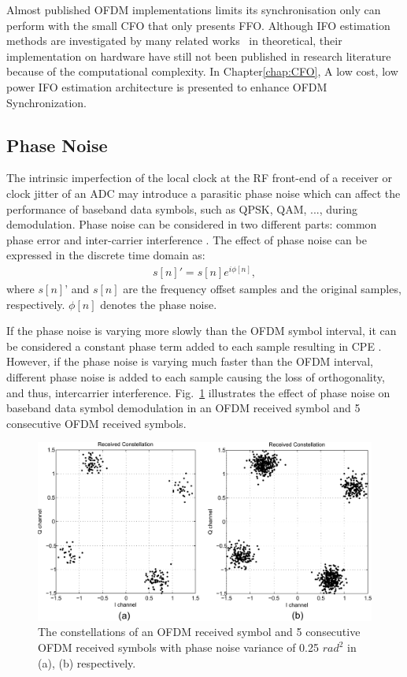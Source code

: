 Almost published OFDM implementations limits its synchronisation only can perform with the small CFO that only presents FFO.
Although IFO estimation methods are investigated by many related works~\cite{Shim2006,Morelli2008,You2010,Lee2013,Morelli2014} in theoretical, their implementation on hardware have still not been published in research literature because of the computational complexity. In Chapter\ref{chap:CFO}, A low cost, low power IFO estimation architecture is presented to enhance OFDM Synchronization. 

\subsection{Phase Noise}

The intrinsic imperfection of the local clock at the RF front-end of a receiver or clock jitter of an ADC may introduce a parasitic phase noise which can affect the performance of baseband data symbols, such as QPSK, QAM, ..., during demodulation.
Phase noise can be considered in two different parts: common phase error and inter-carrier interference \cite{Armada1998}. The effect of phase noise can be expressed in the discrete time domain as:
\begin{eqnarray}
\label{equ:}
            s[n]' = s[n] e^{i\phi[n]},
\end{eqnarray}	
where $s[n]’$ and $s[n]$ are the frequency offset samples and the original samples, respectively.
$\phi[n]$ denotes the phase noise.

If the phase noise is varying more slowly than the OFDM symbol interval, it can be considered a constant phase term added to each sample resulting in CPE \cite{Armada1998}. 
However, if the phase noise is varying much faster than the OFDM interval, different phase noise is added to each sample causing the loss of orthogonality, and thus, intercarrier interference.  
Fig.~\ref{fig:phasenoise} illustrates the effect of phase noise on baseband data symbol demodulation in an OFDM received symbol and 5 consecutive OFDM received symbols.
\begin{figure}
	\centerline{\includegraphics [width=0.8\columnwidth] {Figures/phasenoise.pdf} }
	\caption{The constellations of an OFDM received symbol and 5 consecutive OFDM received symbols with phase noise variance of 0.25 $rad^2$ in (a), (b) respectively.}
	\label{fig:phasenoise}
\end{figure}

